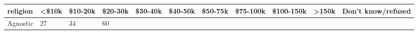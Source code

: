 \documentclass[]{article}
\begin{document}
\begin{longtable}[]{@{}lllllllllll@{}}
\toprule
\begin{minipage}[b]{0.14\columnwidth}\raggedright\strut
religion\strut
\end{minipage} & \begin{minipage}[b]{0.04\columnwidth}\raggedright\strut
\textless{}\$10k\strut
\end{minipage} & \begin{minipage}[b]{0.05\columnwidth}\raggedright\strut
\$10-20k\strut
\end{minipage} & \begin{minipage}[b]{0.05\columnwidth}\raggedright\strut
\$20-30k\strut
\end{minipage} & \begin{minipage}[b]{0.05\columnwidth}\raggedright\strut
\$30-40k\strut
\end{minipage} & \begin{minipage}[b]{0.05\columnwidth}\raggedright\strut
\$40-50k\strut
\end{minipage} & \begin{minipage}[b]{0.05\columnwidth}\raggedright\strut
\$50-75k\strut
\end{minipage} & \begin{minipage}[b]{0.06\columnwidth}\raggedright\strut
\$75-100k\strut
\end{minipage} & \begin{minipage}[b]{0.06\columnwidth}\raggedright\strut
\$100-150k\strut
\end{minipage} & \begin{minipage}[b]{0.04\columnwidth}\raggedright\strut
\textgreater{}150k\strut
\end{minipage} & \begin{minipage}[b]{0.11\columnwidth}\raggedright\strut
Don't know/refused\strut
\end{minipage}\tabularnewline
\midrule
\endhead
\begin{minipage}[t]{0.14\columnwidth}\raggedright\strut
Agnostic\strut
\end{minipage} & \begin{minipage}[t]{0.04\columnwidth}\raggedright\strut
27\strut
\end{minipage} & \begin{minipage}[t]{0.05\columnwidth}\raggedright\strut
34\strut
\end{minipage} & \begin{minipage}[t]{0.05\columnwidth}\raggedright\strut
60\strut
\end{minipage} & \begin{minipage}[t]{0.05\columnwidth}\raggedright\strut

\end{minipage}
\end{longtable}
\end{document}
